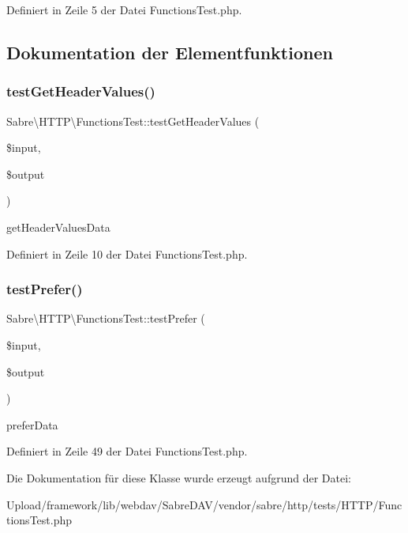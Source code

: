 Definiert in Zeile 5 der Datei Functions\+Test.\+php.



\subsection{Dokumentation der Elementfunktionen}
\mbox{\label{class_sabre_1_1_h_t_t_p_1_1_functions_test_ae011c7d670d306031127db8676de4675}} 
\subsubsection{\texorpdfstring{test\+Get\+Header\+Values()}{testGetHeaderValues()}}
{\footnotesize\ttfamily Sabre\textbackslash{}\+H\+T\+T\+P\textbackslash{}\+Functions\+Test\+::test\+Get\+Header\+Values (\begin{DoxyParamCaption}\item[{}]{\$input,  }\item[{}]{\$output }\end{DoxyParamCaption})}

get\+Header\+Values\+Data 

Definiert in Zeile 10 der Datei Functions\+Test.\+php.

\mbox{\label{class_sabre_1_1_h_t_t_p_1_1_functions_test_a5436c7c7842dec208b0b48617cbb7bfc}} 
\subsubsection{\texorpdfstring{test\+Prefer()}{testPrefer()}}
{\footnotesize\ttfamily Sabre\textbackslash{}\+H\+T\+T\+P\textbackslash{}\+Functions\+Test\+::test\+Prefer (\begin{DoxyParamCaption}\item[{}]{\$input,  }\item[{}]{\$output }\end{DoxyParamCaption})}

prefer\+Data 

Definiert in Zeile 49 der Datei Functions\+Test.\+php.



Die Dokumentation für diese Klasse wurde erzeugt aufgrund der Datei\+:\begin{DoxyCompactItemize}
\item 
Upload/framework/lib/webdav/\+Sabre\+D\+A\+V/vendor/sabre/http/tests/\+H\+T\+T\+P/Functions\+Test.\+php\end{DoxyCompactItemize}
